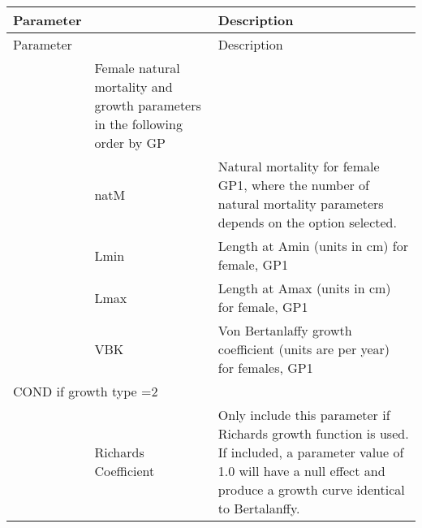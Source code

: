 \begin{center}
	\begin{longtable}{p{1cm} p{2.5cm} p{10cm}}

		Parameter& & Description\\
		\hline
		\endfirsthead

		Parameter& & Description\\
		\hline
		\endhead

		\endfoot

		\endlastfoot

		\multicolumn{2}{l}{Females} & Female natural mortality and growth parameters in the following order by GP\\
		& natM & Natural mortality for female GP1, where the number of natural mortality parameters depends on the option selected.\\
		& Lmin & Length at Amin (units in cm) for female, GP1 \\
		& Lmax & Length at Amax (units in cm) for female, GP1 \\
		& VBK & Von Bertanlaffy growth coefficient (units are per year) for females, GP1\\
		\hline
		\multicolumn{2}{l}{COND if growth type =2 } & \\
		& Richards Coefficient & Only include this parameter if Richards growth function is used.  If included, a parameter value of 1.0 will have a null effect and produce a growth curve identical to Bertalanffy.\\


\end{longtable}
\end{center}
